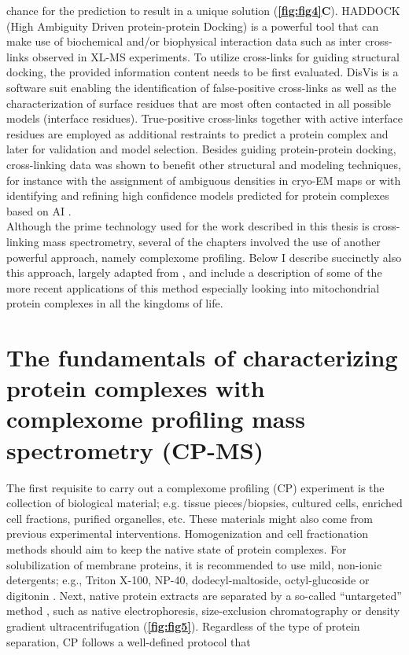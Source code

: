 chance for the prediction to result in a unique solution \cite{Dominguez_2003, van_Zundert_2016} (\textbf{\autoref{fig:fig4}C}). HADDOCK \cite{Dominguez_2003, Orban-Nemeth_2018} (High Ambiguity Driven protein-protein Docking) is a powerful tool that can make use of biochemical and/or biophysical interaction data such as inter cross-links observed in XL-MS experiments. To utilize cross-links for guiding structural docking, the provided information content needs to be first evaluated. DisVis \cite{van_Zundert_2015} is a software suit enabling the identification of false-positive cross-links as well as the characterization of surface residues that are most often contacted in all possible models (interface residues). True-positive cross-links together with active interface residues are employed as additional restraints to predict a protein complex and later for validation and model selection. Besides guiding protein-protein docking, cross-linking data was shown to benefit other structural and modeling techniques, for instance with the assignment of ambiguous densities in cryo-EM maps \cite{Herzog_2012, Kyrilis_2021b} or with identifying and refining high confidence models predicted for protein complexes based on AI \cite{Burke_2021}.\\
Although the prime technology used for the work described in this thesis is cross-linking mass spectrometry, several of the chapters involved the use of another powerful approach, namely complexome profiling. Below I describe succinctly also this approach, largely adapted from \cite{Cabrera-Orefice_2022}, and include a description of some of the more recent applications of this method especially looking into mitochondrial protein complexes in all the kingdoms of life.

\section{The fundamentals of characterizing protein complexes with complexome profiling mass spectrometry (CP-MS)} \label{sec:CP_MS_intro}
The first requisite to carry out a complexome profiling (CP) experiment is the collection of biological material; e.g. tissue pieces/biopsies, cultured cells, enriched cell fractions, purified organelles, etc. These materials might also come from previous experimental interventions. Homogenization and cell fractionation methods should aim to keep the native state of protein complexes. For solubilization of membrane proteins, it is recommended to use mild, non-ionic detergents; e.g., Triton X-100, NP-40, dodecyl-maltoside, octyl-glucoside or digitonin \cite{Eubel_2005, Wittig_2006}. Next, native protein extracts are separated by a so-called “untargeted” method \cite{Iacobucci_2021}, such as native electrophoresis, size-exclusion chromatography or density gradient ultracentrifugation (\textbf{\autoref{fig:fig5}}). Regardless of the type of protein separation, CP follows a well-defined protocol that\\

